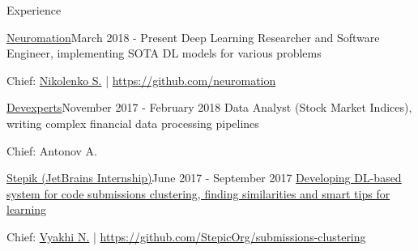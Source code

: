 \documentclass{resume} %
\begin{document}
\begin{rSection}{Experience}

\begin{rSubsection}{\href{https://neuromation.io}{Neuromation}}{March 2018 - Present}
{Deep Learning Researcher and Software Engineer, implementing SOTA DL models for various problems}{} 
\item[] Chief: \href{https://logic.pdmi.ras.ru/~sergey/}{Nikolenko S.} | \url{https://github.com/neuromation}
\end{rSubsection}

\begin{rSubsection}{\href{https://devexperts.com/en/index.html}{Devexperts}}{November 2017 - February 2018}
{Data Analyst (Stock Market Indices), writing complex financial data processing pipelines}{} 
\item[] Chief: Antonov A.
\end{rSubsection}

\begin{rSubsection}{\href{http://stepik.org/}{Stepik (JetBrains Internship)}}{June 2017 - September 2017}
{\href{https://jetbrains.ru/students/internship/themes/again/}{Developing DL-based system for code submissions clustering, finding similarities and smart tips for learning}}{} 
\item[] Chief: \href{http://bioinformaticsinstitute.ru/teachers/vyahhi}{Vyakhi N.} | \url{https://github.com/StepicOrg/submissions-clustering}
\end{rSubsection}

\end{rSection} 
\vspace{-1.2\baselineskip}
\end{document}
